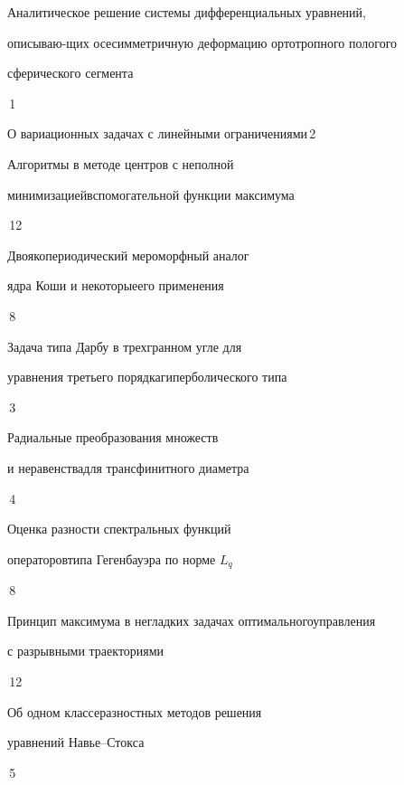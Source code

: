 {Аналитическое решение системы дифференциальных уравнений, 


описываю-\newline щих осесимметричную деформацию ортотропного пологого 


сферического сегмента}{\No\,1}




{О вариационных задачах с линейными ограничениями}{\No\,2}




{Алгоритмы в методе центров с неполной


минимизацией\newline вспомогательной функции максимума}{\No\,12}




{Двоякопериодический мероморфный аналог 


ядра Коши и некоторые\newline его применения}{\No\,8}




{Задача типа Дарбу в трехгранном угле для


уравнения третьего порядка\newline гиперболического типа}{\No\,3}




{Радиальные преобразования множеств


и неравенства\newline для трансфинитного диаметра}{\No\,4}




{Оценка разности спектральных функций 


операторов\newline типа Гегенбауэра по норме $L_q$}{\No\,8}




{Принцип максимума в негладких задачах оптимального\newline управления


с разрывными траекториями}{\No\,12}




{Об одном классе\newline разностных методов решения


уравнений Навье--Стокса}{\No\,5}




